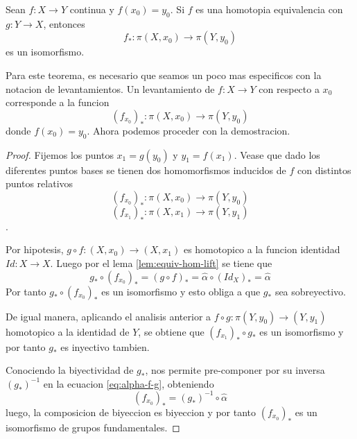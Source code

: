 \begin{teorema}
  Sean \(f : X \to Y\) continua y \(f (x_0) = y_0\). Si \(f\) es una
  homotopia equivalencia con \(g : Y \to X\), entonces
  \[ f_* : \pi (X, x_0) \to \pi (Y, y_0)\]
  es un isomorfismo.
\end{teorema}
Para este teorema, es necesario que seamos un poco mas especificos con la
notacion de levantamientos. Un levantamiento de \(f :
X \to Y\) con respecto a \(x_0\) corresponde a la funcion
\[ (f_{x_0})_{*} : \pi (X , x_0) \to \pi (Y, y_0)\]
donde \(f(x_0) = y_0\). Ahora podemos proceder con la demostracion.
\begin{proof}
  Fijemos los puntos \(x_1 = g(y_0)\) y \(y_1 = f(x_1)\). Vease que dado
  los diferentes puntos bases se tienen dos homomorfismos inducidos de
  \(f\) con distintos puntos relativos \[(f_{x_0})_* : \pi (X, x_0) \to \pi
  (Y, y_0)\] \[(f_{x_1})_* : \pi (X, x_1) \to \pi (Y, y_1)\].

  Por hipotesis, \(g \circ f : (X, x_0) \to (X, x_1)\) es homotopico a
  la funcion identidad \(Id : X \to X\). Luego por el lema
  \ref{lem:equiv-hom-lift} se tiene que
  \begin{equation} \label{eq:alpha-f-g}
  g_* \circ (f_{x_0})_* = (g \circ f)_* = \hat \alpha \circ (Id_X)_*
    = \hat \alpha
  \end{equation}
  Por tanto \(g_* \circ (f_{x_0})_*\) es un isomorfismo y esto obliga a
  que \(g_*\) sea sobreyectivo.

  De igual manera, aplicando el analisis anterior a \(f \circ g : \pi
  (Y, y_0) \to (Y, y_1)\) homotopico a la identidad de \(Y\), se
  obtiene que \((f_{x_1})_* \circ g_*\) es un isomorfismo y por tanto
  \(g_*\) es inyectivo tambien.

  Conociendo la biyectividad de \(g_*\), nos permite pre-componer por su
  inversa \((g_*)^{-1}\) en la ecuacion \eqref{eq:alpha-f-g}, obteniendo
  \[ (f_{x_0})_* = (g_*)^{-1} \circ \hat \alpha\]
  luego, la composicion de biyeccion es biyeccion y por tanto
  \((f_{x_0})_*\) es un isomorfismo de grupos fundamentales.
\end{proof}

